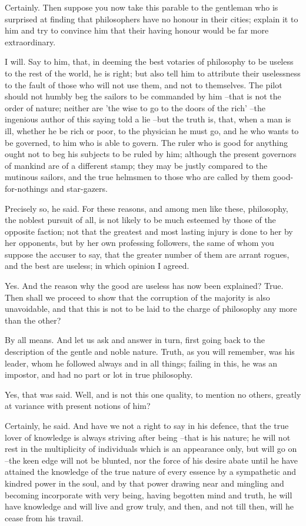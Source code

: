 Certainly.
Then suppose you now take this parable to the gentleman who is surprised at finding that philosophers have no honour in their cities; explain it to him and try to convince him that their having honour would be far more extraordinary.

I will.
Say to him, that, in deeming the best votaries of philosophy to be useless to the rest of the world, he is right; but also tell him to attribute their uselessness to the fault of those who will not use them, and not to themselves. The pilot should not humbly beg the sailors to be commanded by him --that is not the order of nature; neither are 'the wise to go to the doors of the rich' --the ingenious author of this saying told a lie --but the truth is, that, when a man is ill, whether he be rich or poor, to the physician he must go, and he who wants to be governed, to him who is able to govern. The ruler who is good for anything ought not to beg his subjects to be ruled by him; although the present governors of mankind are of a different stamp; they may be justly compared to the mutinous sailors, and the true helmsmen to those who are called by them good-for-nothings and star-gazers.

Precisely so, he said.
For these reasons, and among men like these, philosophy, the noblest pursuit of all, is not likely to be much esteemed by those of the opposite faction; not that the greatest and most lasting injury is done to her by her opponents, but by her own professing followers, the same of whom you suppose the accuser to say, that the greater number of them are arrant rogues, and the best are useless; in which opinion I agreed.

Yes.
And the reason why the good are useless has now been explained?
True.
Then shall we proceed to show that the corruption of the majority is also unavoidable, and that this is not to be laid to the charge of philosophy any more than the other?

By all means.
And let us ask and answer in turn, first going back to the description of the gentle and noble nature. Truth, as you will remember, was his leader, whom he followed always and in all things; failing in this, he was an impostor, and had no part or lot in true philosophy.

Yes, that was said.
Well, and is not this one quality, to mention no others, greatly at variance with present notions of him?

Certainly, he said.
And have we not a right to say in his defence, that the true lover of knowledge is always striving after being --that is his nature; he will not rest in the multiplicity of individuals which is an appearance only, but will go on --the keen edge will not be blunted, nor the force of his desire abate until he have attained the knowledge of the true nature of every essence by a sympathetic and kindred power in the soul, and by that power drawing near and mingling and becoming incorporate with very being, having begotten mind and truth, he will have knowledge and will live and grow truly, and then, and not till then, will he cease from his travail.

